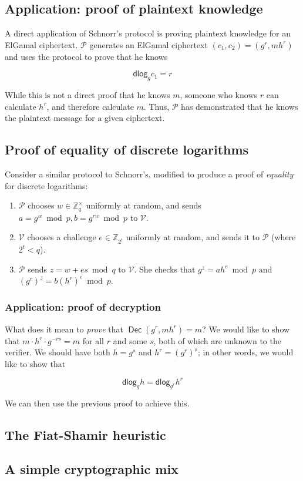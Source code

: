 \documentclass[12pt,a4paper]{article}
\DeclareMathOperator{\Dec}{\mathsf{Dec}}
\newcommand{\dlog}{\mathsf{dlog}}
\theoremstyle{definition}
\begin{document}
\subsection{Application: proof of plaintext knowledge}
A direct application of Schnorr's protocol is proving plaintext knowledge for an ElGamal ciphertext. $\mathcal{P}$ generates an ElGamal ciphertext $(c_1, c_2)=(g^r, mh^r)$ and uses the protocol to prove that he knows

$$\dlog_g{c_1}=r$$

While this is not a direct proof that he knows $m$, someone who knows $r$ can calculate $h^r$, and therefore calculate $m$. Thus, $\mathcal{P}$ has demonstrated that he knows the plaintext message for a given ciphertext.

\subsection{Proof of equality of discrete logarithms}
Consider a similar protocol to Schnorr's, modified to produce a proof of \textit{equality} for discrete logarithms:
\begin{enumerate}
    \item $\mathcal{P}$ chooses $w\in\mathbb{Z}^\times_q$ uniformly at random, and sends $a=g^w\bmod p,b=g^{rw}\bmod p$ to $\mathcal{V}$.
    \item $\mathcal{V}$ chooses a challenge $e\in\mathbb{Z}_{2^t}$ uniformly at random, and sends it to $\mathcal{P}$ (where $2^t<q$).
    \item $\mathcal{P}$ sends $z=w+es\bmod q$ to $\mathcal{V}$. She checks that $g^z=ah^e\bmod p$ and $(g^r)^z=b(h^r)^e\bmod p$.
\end{enumerate}

\subsubsection{Application: proof of decryption}
What does it mean to \textit{prove} that $\Dec(g^r,mh^r)=m$? We would like to show that $m\cdot h^r\cdot g^{-rs}=m$ for all $r$ and some $s$, both of which are unknown to the verifier. We should have both $h=g^s$ and $h^r=(g^r)^s$; in other words, we would like to show that

$$\dlog_g{h}=\dlog_{g^r}{h^r}$$

We can then use the previous proof to achieve this.
\subsection{The Fiat-Shamir heuristic}
\subsection{A simple cryptographic mix}
\end{document}
